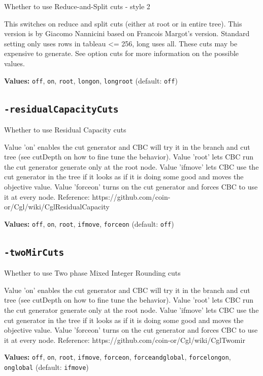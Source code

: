\documentclass[11pt,a4paper]{article}
\begin{document}
Whether to use Reduce-and-Split cuts - style 2

This switches on reduce and split cuts (either at root or in entire tree). This version is by Giacomo Nannicini based on Francois Margot's version. Standard setting only uses rows in tableau <= 256, long uses all. These cuts may be expensive to generate. See option cuts for more information on the possible values.

\textbf{Values:} \texttt{off}, \texttt{on}, \texttt{root}, \texttt{longon}, \texttt{longroot} (default: \texttt{off})

\subsection*{\texttt{-residualCapacityCuts}}

Whether to use Residual Capacity cuts

Value 'on' enables the cut generator and CBC will try it in the branch and cut tree (see cutDepth on how to fine tune the behavior). Value 'root' lets CBC run the cut generator generate only at the root node. Value 'ifmove' lets CBC use the cut generator in the tree if it looks as if it is doing some good and moves the objective value. Value 'forceon' turns on the cut generator and forces CBC to use it at every node.
 Reference: https://github.com/coin-or/Cgl/wiki/CglResidualCapacity

\textbf{Values:} \texttt{off}, \texttt{on}, \texttt{root}, \texttt{ifmove}, \texttt{forceon} (default: \texttt{off})

\subsection*{\texttt{-twoMirCuts}}

Whether to use Two phase Mixed Integer Rounding cuts

Value 'on' enables the cut generator and CBC will try it in the branch and cut tree (see cutDepth on how to fine tune the behavior). Value 'root' lets CBC run the cut generator generate only at the root node. Value 'ifmove' lets CBC use the cut generator in the tree if it looks as if it is doing some good and moves the objective value. Value 'forceon' turns on the cut generator and forces CBC to use it at every node.
 Reference: https://github.com/coin-or/Cgl/wiki/CglTwomir

\textbf{Values:} \texttt{off}, \texttt{on}, \texttt{root}, \texttt{ifmove}, \texttt{forceon}, \texttt{forceandglobal}, \texttt{forcelongon}, \texttt{onglobal} (default: \texttt{ifmove})
\end{document}
